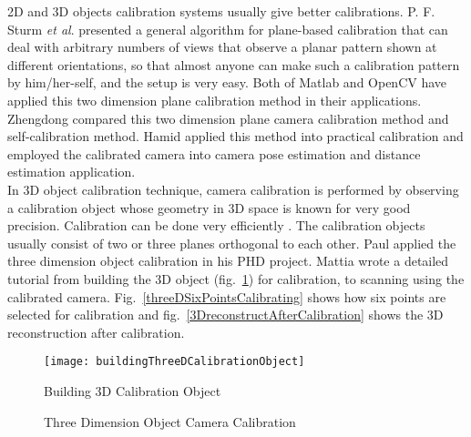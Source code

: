 2D and 3D objects calibration systems usually give better calibrations. P. F. Sturm \textit{et al}. \cite{twoDcalibration1_1999} presented a general algorithm for plane-based calibration
that can deal with arbitrary numbers of views that observe a planar pattern shown at different orientations, so that almost anyone can make such a calibration pattern by him/her-self, and the setup is very easy. Both of Matlab and OpenCV have applied this two dimension plane calibration method in their applications. Zhengdong \cite{twoDcalibration2_2011} compared this two dimension plane camera calibration method and self-calibration method. Hamid \cite{twoDcalibration3_2015} applied this method into practical calibration and employed the calibrated camera into camera pose estimation and distance estimation application.
\\\indent
In 3D object calibration technique, camera calibration is performed by observing a calibration object whose geometry in 3D space is known for very good precision. Calibration can be done very efficiently \cite{treeDcalibration1_1993}. The calibration objects usually consist of two or three planes orthogonal to each other. Paul \cite{treeDcalibration2_1996} applied the three dimension object calibration in his PHD project. Mattia \cite{threeDExample_2014} wrote a detailed tutorial from building the 3D object (fig.~\ref{buildingThreeDCalibrationObject}) for calibration, to scanning using the calibrated camera. Fig.~\ref{threeDSixPointsCalibrating} shows how six points are selected for calibration and fig.~\ref{3DreconstructAfterCalibration} shows the 3D reconstruction after calibration.
%
\begin{figure}[!b]
\centering
\texttt{[image: buildingThreeDCalibrationObject]}
\caption{Building 3D Calibration Object \cite{threeDExample_2014}}
\label{buildingThreeDCalibrationObject}
\end{figure}%
%
\begin{figure}[!t]
\centering
{}
\caption{Three Dimension Object Camera Calibration \cite{threeDExample_2014}}
\label{twoPlanesCalibration}
\end{figure}%
%


%




